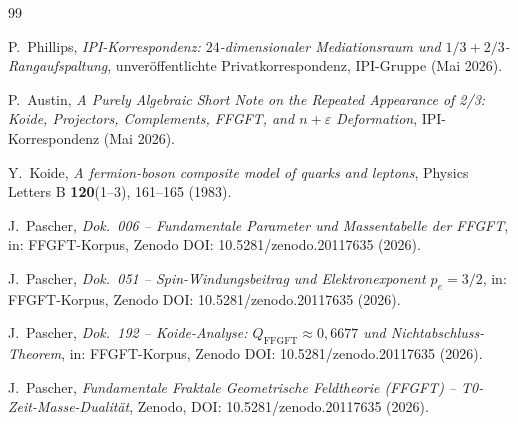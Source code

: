 \begin{thebibliography}{99}

P.~Phillips,
\textit{IPI-Korrespondenz: \(24\)-dimensionaler Mediationsraum und
\(1/3 + 2/3\)-Rangaufspaltung},
unveröffentlichte Privatkorrespondenz, IPI-Gruppe (Mai 2026).

P.~Austin,
\textit{A Purely Algebraic Short Note on the Repeated Appearance of 2/3:
Koide, Projectors, Complements, FFGFT, and \(n+\varepsilon\) Deformation},
IPI-Korrespondenz (Mai 2026).

Y.~Koide,
\textit{A fermion-boson composite model of quarks and leptons},
Physics Letters B \textbf{120}(1--3), 161--165 (1983).

J.~Pascher,
\textit{Dok.~006 -- Fundamentale Parameter und Massentabelle der FFGFT},
in: FFGFT-Korpus, Zenodo DOI: 10.5281/zenodo.20117635 (2026).

J.~Pascher,
\textit{Dok.~051 -- Spin-Windungsbeitrag und Elektronexponent \(p_e = 3/2\)},
in: FFGFT-Korpus, Zenodo DOI: 10.5281/zenodo.20117635 (2026).

J.~Pascher,
\textit{Dok.~192 -- Koide-Analyse: \(Q_{\text{FFGFT}} \approx 0{,}6677\)
und Nichtabschluss-Theorem},
in: FFGFT-Korpus, Zenodo DOI: 10.5281/zenodo.20117635 (2026).

J.~Pascher,
\textit{Fundamentale Fraktale Geometrische Feldtheorie (FFGFT) --
T0-Zeit-Masse-Dualität},
Zenodo, DOI: 10.5281/zenodo.20117635 (2026).

\end{thebibliography}
